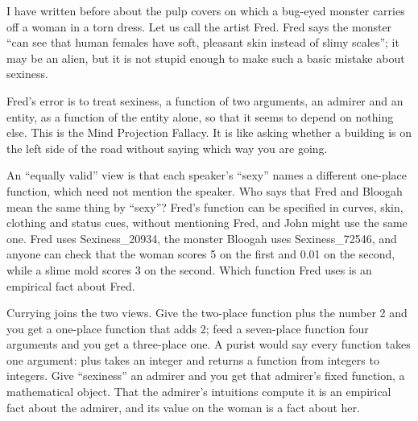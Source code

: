 
I have written before about the pulp covers on which a bug-eyed monster carries off a woman in a torn dress. Let us call the artist Fred. Fred says the monster ``can see that human females have soft, pleasant skin instead of slimy scales''; it may be an alien, but it is not stupid enough to make such a basic mistake about sexiness.

Fred's error is to treat sexiness, a function of two arguments, an admirer and an entity, as a function of the entity alone, so that it seems to depend on nothing else. This is the Mind Projection Fallacy. It is like asking whether a building is on the left side of the road without saying which way you are going. 

An ``equally valid'' view is that each speaker's ``sexy'' names a different one-place function, which need not mention the speaker. Who says that Fred and Bloogah mean the same thing by ``sexy''? Fred's function can be specified in curves, skin, clothing and status cues, without mentioning Fred, and John might use the same one. Fred uses Sexiness\_20934, the monster Bloogah uses Sexiness\_72546, and anyone can check that the woman scores 5 on the first and 0.01 on the second, while a slime mold scores 3 on the second. Which function Fred uses is an empirical fact about Fred. 

Currying joins the two views. Give the two-place function plus the number 2 and you get a one-place function that adds 2; feed a seven-place function four arguments and you get a three-place one. A purist would say every function takes one argument: plus takes an integer and returns a function from integers to integers. Give ``sexiness'' an admirer and you get that admirer's fixed function, a mathematical object. That the admirer's intuitions compute it is an empirical fact about the admirer, and its value on the woman is a fact about her. 

